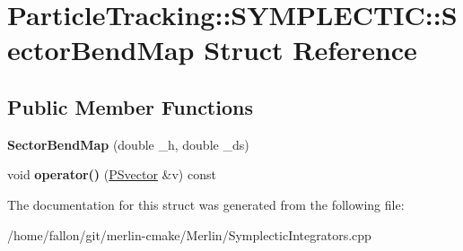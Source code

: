 \hypertarget{structParticleTracking_1_1SYMPLECTIC_1_1SectorBendMap}{}\section{Particle\+Tracking\+:\+:S\+Y\+M\+P\+L\+E\+C\+T\+IC\+:\+:Sector\+Bend\+Map Struct Reference}
\label{structParticleTracking_1_1SYMPLECTIC_1_1SectorBendMap}
\subsection*{Public Member Functions}
\begin{DoxyCompactItemize}
\item 
\mbox{\label{structParticleTracking_1_1SYMPLECTIC_1_1SectorBendMap_afe130c8a7e3570d6d6f5eebabd93b4a6}} 
{\bfseries Sector\+Bend\+Map} (double \+\_\+h, double \+\_\+ds)
\item 
\mbox{\label{structParticleTracking_1_1SYMPLECTIC_1_1SectorBendMap_a45ce704555275a466a79e7a644d34aa6}} 
void {\bfseries operator()} (\hyperlink{classPSvector}{P\+Svector} \&v) const
\end{DoxyCompactItemize}


The documentation for this struct was generated from the following file\+:\begin{DoxyCompactItemize}
\item 
/home/fallon/git/merlin-\/cmake/\+Merlin/Symplectic\+Integrators.\+cpp\end{DoxyCompactItemize}
